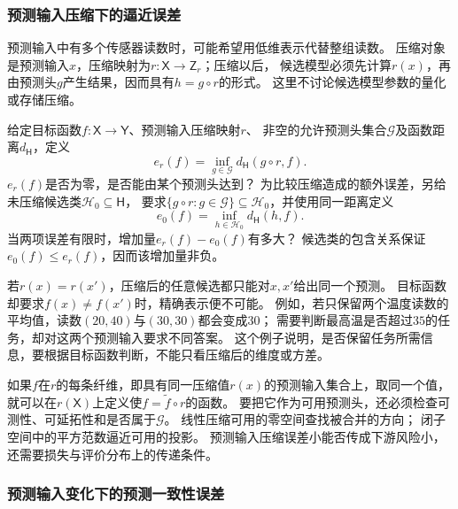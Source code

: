 \subsubsection{预测输入压缩下的逼近误差}
\label{sec:future-analysis-input-compression}

预测输入中有多个传感器读数时，可能希望用低维表示代替整组读数。
压缩对象是预测输入$x$，压缩映射为$r:\mathsf X\to\mathsf Z_r$；压缩以后，
候选模型必须先计算$r(x)$，再由预测头$g$产生结果，因而具有$h=g\circ r$的形式。
这里不讨论候选模型参数的量化或存储压缩。

\begin{mathproblem}[预测输入压缩造成的最佳逼近误差]
  \label{question:future-input-compression}
  给定目标函数$f:\mathsf X\to\mathsf Y$、预测输入压缩映射$r$、
  非空的允许预测头集合$\mathcal G$及函数距离$d_{\mathsf H}$，定义
  \[
    e_r(f)=\inf_{g\in\mathcal G}d_{\mathsf H}(g\circ r,f).
  \]
  $e_r(f)$是否为零，是否能由某个预测头达到？
  为比较压缩造成的额外误差，另给未压缩候选类$\mathcal H_0\subseteq\mathsf H$，
  要求$\{g\circ r:g\in\mathcal G\}\subseteq\mathcal H_0$，并使用同一距离定义
  \[
    e_0(f)=\inf_{h\in\mathcal H_0}d_{\mathsf H}(h,f).
  \]
  当两项误差有限时，增加量$e_r(f)-e_0(f)$有多大？
  候选类的包含关系保证$e_0(f)\leq e_r(f)$，因而该增加量非负。
\end{mathproblem}

若$r(x)=r(x')$，压缩后的任意候选都只能对$x,x'$给出同一个预测。
目标函数却要求$f(x)\ne f(x')$时，精确表示便不可能。
例如，若只保留两个温度读数的平均值，读数$(20,40)$与$(30,30)$都会变成$30$；
需要判断最高温是否超过$35$的任务，却对这两个预测输入要求不同答案。
这个例子说明，是否保留任务所需信息，要根据目标函数判断，不能只看压缩后的维度或方差。

如果$f$在$r$的每条纤维，即具有同一压缩值$r(x)$的预测输入集合上，取同一个值，就可以在$r(\mathsf X)$上定义使$f=\widetilde f\circ r$的函数。
要把它作为可用预测头，还必须检查可测性、可延拓性和是否属于$\mathcal G$。
线性压缩可用的零空间查找被合并的方向；
闭子空间中的平方范数逼近可用的投影。
预测输入压缩误差小能否传成下游风险小，还需要损失与评价分布上的传递条件。

\subsubsection{预测输入变化下的预测一致性误差}
\label{sec:future-analysis-structural-property}

